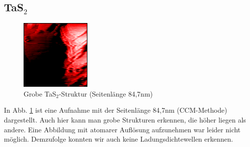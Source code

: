 \subsection{TaS$_2$}
\begin{figure}
\centering
\includegraphics[scale=1]{data/tas2.png}
\caption{Grobe TaS$_2$-Struktur (Seitenlänge 84,7nm)}
\label{fig:tas2}
\end{figure}
In Abb. \ref{fig:tas2} ist eine Aufnahme mit der Seitenlänge 84,7nm (CCM-Methode) dargestellt. Auch hier kann man grobe Strukturen erkennen, die höher liegen als andere. Eine Abbildung mit atomarer Auflösung aufzunehmen war leider nicht möglich. Demzufolge konnten wir auch keine Ladungsdichtewellen erkennen. 
